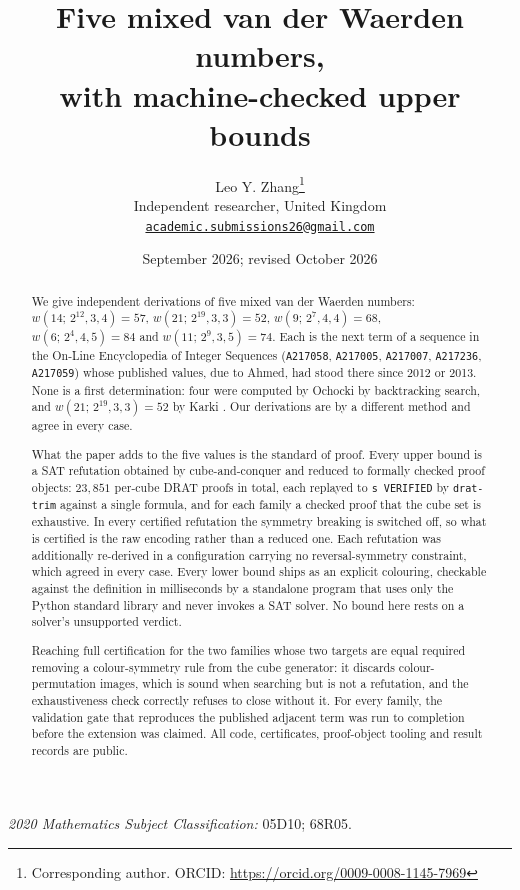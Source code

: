 \documentclass[12pt]{article}
\title{Five mixed van der Waerden numbers,\\with machine-checked upper bounds}
\author{Leo Y. Zhang\thanks{Corresponding author. ORCID: \url{https://orcid.org/0009-0008-1145-7969}}\\[2pt]
  \small Independent researcher, United Kingdom\\[2pt]
  \small \href{mailto:academic.submissions26@gmail.com}{\texttt{academic.submissions26@gmail.com}}}
\date{September 2026; revised October 2026}
\theoremstyle{remark}
\newcommand{\seq}[1]{\texttt{#1}}
\begin{document}
\maketitle

\begin{abstract}
We give independent derivations of five mixed van der Waerden numbers:
$w(14;\,2^{12},3,4)=57$, $w(21;\,2^{19},3,3)=52$,
$w(9;\,2^{7},4,4)=68$, $w(6;\,2^{4},4,5)=84$ and $w(11;\,2^{9},3,5)=74$. Each
is the next term of a sequence in the On-Line Encyclopedia of Integer
Sequences (\seq{A217058}, \seq{A217005}, \seq{A217007}, \seq{A217236},
\seq{A217059}) whose published values, due to Ahmed, had stood there since
2012 or 2013. None is a first determination: four were computed by Ochocki
\cite{ochocki} by backtracking search, and $w(21;\,2^{19},3,3)=52$ by Karki
\cite{karki}. Our derivations are by a different method and agree in every
case.

What the paper adds to the five values is the standard of proof.
Every upper bound is a SAT refutation obtained by cube-and-conquer and reduced
to formally checked proof objects: $23{,}851$ per-cube DRAT proofs in total,
each replayed to \texttt{s VERIFIED} by \texttt{drat-trim} against a single
formula, and for each family a checked proof that the cube set is exhaustive.
In every certified refutation the symmetry breaking is switched off, so what
is certified is the raw encoding rather than a reduced one. Each refutation
was additionally re-derived in a configuration carrying no reversal-symmetry
constraint, which agreed in every case. Every lower bound ships as an explicit
colouring, checkable against the definition in milliseconds by a standalone
program that uses only the Python standard library and never invokes a SAT
solver. No bound here rests on a solver's unsupported verdict.

Reaching full certification for the two families whose two targets are equal
required removing a colour-symmetry rule from the cube generator: it discards
colour-permutation images, which is sound when searching but is not a
refutation, and the exhaustiveness check correctly refuses to close without
it. For every family, the validation gate that reproduces the published
adjacent term was run to completion before the extension was claimed. All
code, certificates, proof-object tooling and result records are public.
\end{abstract}

\noindent\emph{2020 Mathematics Subject Classification:} 05D10; 68R05.
\end{document}
